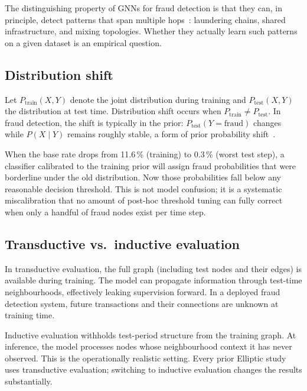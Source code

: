 The distinguishing property of GNNs for fraud detection is that they
can, in principle, detect patterns that span multiple
hops~\citep{wu2020gnnsurvey}: laundering chains, shared
infrastructure, and mixing topologies.  Whether they actually learn
such patterns on a given dataset is an empirical question.

\subsection{Distribution shift}

Let $P_{\text{train}}(X, Y)$ denote the joint distribution during
training and $P_{\text{test}}(X, Y)$ the distribution at test time.
Distribution shift occurs when $P_{\text{train}} \neq P_{\text{test}}$.
In fraud detection, the shift is typically in the prior:
$P_{\text{test}}(Y{=}\text{fraud})$ changes while
$P(X \mid Y)$ remains roughly stable, a form of prior probability
shift~\citep{quinonero2009shift}.

When the base rate drops from 11.6\,\% (training) to 0.3\,\% (worst
test step), a classifier calibrated to the training prior will
assign fraud probabilities that were borderline under the old
distribution.  Now those probabilities fall below any reasonable
decision threshold.  This is not model confusion; it is a systematic
miscalibration that no amount of post-hoc threshold tuning can fully
correct when only a handful of fraud nodes exist per time step.

\subsection{Transductive vs.\ inductive evaluation}

In transductive evaluation, the full graph (including test nodes and
their edges) is available during training.  The model can propagate
information through test-time neighbourhoods, effectively leaking
supervision forward.  In a deployed fraud detection system, future
transactions and their connections are unknown at training time.

Inductive evaluation withholds test-period structure from the training
graph.  At inference, the model processes nodes whose neighbourhood
context it has never observed.  This is the operationally realistic
setting.  Every prior Elliptic study uses transductive evaluation;
switching to inductive evaluation changes the results substantially.


